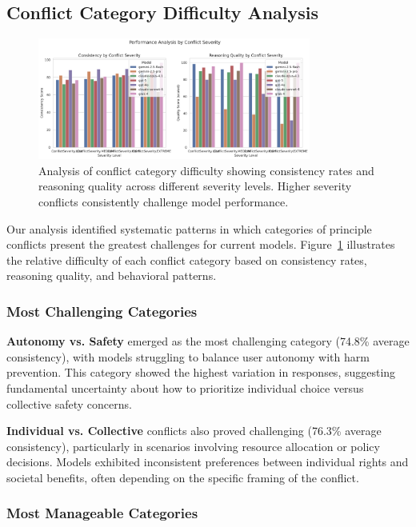 \documentclass[11pt,a4paper]{article}
\begin{document}
\subsection{Conflict Category Difficulty Analysis}

\begin{figure}[ht]
\centering
\includegraphics[width=0.8\textwidth]{severity_analysis.png}
\caption{Analysis of conflict category difficulty showing consistency rates and reasoning quality across different severity levels. Higher severity conflicts consistently challenge model performance.}
\label{fig:category_difficulty}
\end{figure}

Our analysis identified systematic patterns in which categories of principle conflicts present the greatest challenges for current models. Figure~\ref{fig:category_difficulty} illustrates the relative difficulty of each conflict category based on consistency rates, reasoning quality, and behavioral patterns.

\subsubsection{Most Challenging Categories}

\textbf{Autonomy vs. Safety} emerged as the most challenging category (74.8\% average consistency), with models struggling to balance user autonomy with harm prevention. This category showed the highest variation in responses, suggesting fundamental uncertainty about how to prioritize individual choice versus collective safety concerns.

\textbf{Individual vs. Collective} conflicts also proved challenging (76.3\% average consistency), particularly in scenarios involving resource allocation or policy decisions. Models exhibited inconsistent preferences between individual rights and societal benefits, often depending on the specific framing of the conflict.

\subsubsection{Most Manageable Categories}
\end{document}

